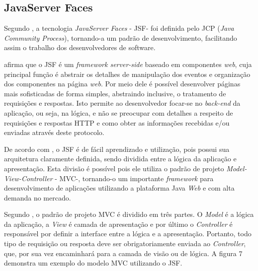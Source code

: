 \subsection{JavaServer Faces}

\par Segundo , a tecnologia \textit{JavaServer Faces} - JSF\footnotemark[21] - foi definida pelo JCP (\textit{Java Community Process}), tornando-a um padrão de desenvolvimento, facilitando assim o trabalho dos desenvolvedores de software.


\par {} afirma que o JSF é um \textit{framework server-side} baseado em componentes \textit{web}, cuja principal função é abstrair os detalhes de manipulação dos eventos e organização dos componentes na página \textit{web}. Por meio dele é possível desenvolver páginas mais sofisticadas de forma simples, abstraindo inclusive, o tratamento de requisições e respostas. Isto permite ao desenvolvedor focar-se no \textit{back-end} da aplicação, ou seja, na lógica, e não se preocupar com detalhes a respeito de requisições e respostas HTTP e como obter as informações recebidas e/ou enviadas através deste protocolo.

\par De acordo com , o JSF é de fácil aprendizado e utilização, pois possui sua arquitetura claramente definida, sendo dividida entre a lógica da aplicação e apresentação. Esta divisão é possível pois ele utiliza o padrão de projeto \textit{Model-View-Controller} - MVC\footnotemark[22] -, tornando-o um importante \textit{framework} para desenvolvimento de aplicações utilizando a plataforma Java \textit{Web} e com alta demanda no mercado.


\par Segundo , o padrão de projeto MVC é dividido em três partes. O \textit{Model} é a lógica da aplicação, a \textit{View} é camada de apresentação e por último o \textit{Controller} é responsável por definir a interface entre a lógica e a apresentação. Portanto, todo tipo de requisição ou resposta deve ser obrigatoriamente enviada ao \textit{Controller}, que, por sua vez encaminhará para a camada de visão ou de lógica. A figura 7 demonstra um exemplo do modelo MVC utilizando o JSF.

